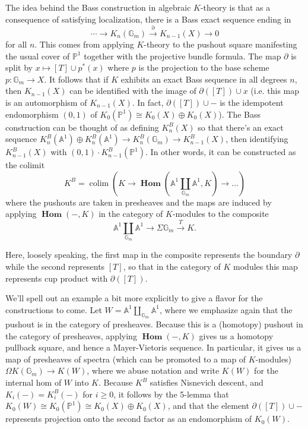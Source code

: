 \documentclass[edeposit,fullpage]{uiucthesis2009}
\newcommand{\mbb}{\mathbb}
\DeclareMathOperator*{\colim}{colim}
\DeclareMathOperator{\iHom}{\mathbf{Hom}}
\theoremstyle{plain}
\numberwithin{lemma}{section}
\theoremstyle{definition}
\begin{document}
The idea behind the Bass construction in algebraic $K$-theory is that
as a consequence of satisfying localization, there is a
Bass exact sequence ending in
\[
\cdots \rightarrow K_n(\mbb G_m) \xrightarrow{\partial} K_{n-1}(X) \rightarrow 0
\]
for all $n$. This comes from applying $K$-theory to the pushout square manifesting
the usual cover of $\mbb P^1$ together with the projective bundle formula. The map $\partial$ is split by $x
\mapsto [T] \cup p^*(x)$ where $p$ is the projection to the base scheme $p : \mbb G_m
\rightarrow X$. It follows that if $K$ exhibits an exact Bass sequence
in all degrees $n$, then $K_{n-1}(X)$ can be identified with
the image of $\partial([T]) \cup x$ (i.e. this map is an automorphism
of $K_{n-1}(X)$. In fact, $\partial([T]) \cup -$ is the idempotent endomorphism
$(0,1)$ of $K_{0}(\mbb P^1) \cong K_0(X) \oplus K_0(X)$).
 The Bass construction can be thought of as defining
$K^B_n(X)$ so that there's an exact sequence $K^B_n(\mbb A^1) \oplus
K^B_n(\mbb A^1) \rightarrow K^B_n(\mbb G_m) \rightarrow K^B_{n-1}(X)$,
then identifying $K^B_{n-1}(X)$ with $(0,1) \cdot
K^B_{n-1}(\mbb P^1)$. In other words, it can be constructed as the colimit
\[
K^B = \colim(K \rightarrow \iHom(\mbb A^1 \coprod_{\mbb G_m} \mbb
A^1,K) \rightarrow \dots)
\] 
where the pushouts are taken in presheaves and the maps are induced by applying $\iHom(-,K)$ in the category of
$K$-modules to the composite
\[
\mbb A^1 \coprod_{\mbb G_m} \mbb A^1 \rightarrow \Sigma \mbb G_m
\xrightarrow{T} K.
\]

Here, loosely speaking, the first map in the composite represents the boundary $\partial$
while the second represents $[T]$, so that in the category of $K$
modules this map represents cup product with $\partial([T])$. 

We'll spell out an example a bit more explicitly to give a flavor for the
constructions to come. Let $W = \mbb A^1 \coprod_{\mbb G_m} \mbb A^1$,
where we emphasize again that the pushout is in the category of
presheaves. Because this is a (homotopy) pushout in the category of
presheaves, applying $\iHom(-,K)$ gives us a homotopy pullback square,
and hence a Mayer-Vietoris sequence. In particular, it gives us a map
of presheaves of spectra (which can be promoted to a map of $K$-modules) $\Omega  K(\mbb G_m) \rightarrow K(W)$, where
we abuse notation and write $K(W)$ for the internal hom of $W$ into
$K$. Because $K^B$ satisfies Nisnevich descent, and $K_i(-) =
K^B_i(-)$ for $i \geq 0$, it follows by the 5-lemma that $K_0(W) \cong
K_0(\mbb P^1) \cong K_0(X) \oplus K_0(X)$, and that the element
$\partial([T]) \cup -$ represents projection onto the second factor as an
endomorphism of $K_0(W)$. 
\end{document}
